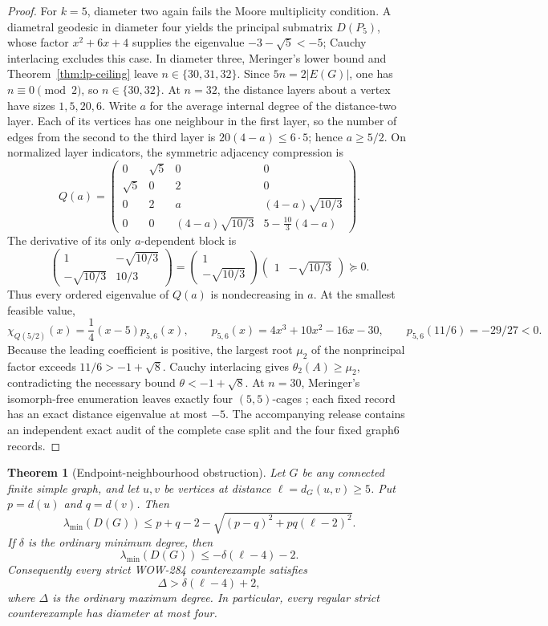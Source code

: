 \documentclass[a4paper,10pt,reqno]{amsart}
\theoremstyle{plain}
\newtheorem{theorem}{Theorem}[section]
\theoremstyle{definition}
\theoremstyle{remark}
\newcommand{\resultbox}[1]{\boxed{#1}}
\begin{document}
\begin{proof}
For \(k=5\), diameter two again fails the Moore multiplicity condition.
A diametral geodesic in diameter four yields the principal submatrix
\(D(P_5)\), whose factor \(x^2+6x+4\) supplies the eigenvalue
\(-3-\sqrt5<-5\); Cauchy interlacing excludes this case.  In diameter
three, Meringer's lower bound and Theorem~\ref{thm:lp-ceiling} leave
\(n\in\{30,31,32\}\).  Since \(5n=2|E(G)|\), one has
\(n\equiv0\pmod2\), so \(n\in\{30,32\}\).  At \(n=32\), the distance
layers about a vertex have sizes \(1,5,20,6\).  Write \(a\) for the average
internal degree of the distance-two layer.  Each of its vertices has one
neighbour in the first layer, so the number of edges from the second to the
third layer is \(20(4-a)\le6\cdot5\); hence \(a\ge5/2\).  On normalized
layer indicators, the symmetric adjacency compression is
\[
 Q(a)=
 \begin{pmatrix}
 0&\sqrt5&0&0\\
 \sqrt5&0&2&0\\
 0&2&a&(4-a)\sqrt{10/3}\\
 0&0&(4-a)\sqrt{10/3}&5-\frac{10}{3}(4-a)
 \end{pmatrix}.
\]
The derivative of its only \(a\)-dependent block is
\[
 \begin{pmatrix}1&-\sqrt{10/3}\\-\sqrt{10/3}&10/3\end{pmatrix}
 =
 \begin{pmatrix}1\\-\sqrt{10/3}\end{pmatrix}
 \begin{pmatrix}1&-\sqrt{10/3}\end{pmatrix}\succeq0.
\]
Thus every ordered eigenvalue of \(Q(a)\) is nondecreasing in \(a\).
At the smallest feasible value,
\[
 \chi_{Q(5/2)}(x)=\frac14(x-5)p_{5,6}(x),
 \qquad
 p_{5,6}(x)=4x^3+10x^2-16x-30,
 \qquad p_{5,6}(11/6)=-29/27<0.
\]
Because the leading coefficient is positive, the largest root \(\mu_2\) of
the nonprincipal factor exceeds \(11/6>-1+\sqrt8\).  Cauchy interlacing gives
\(\theta_2(A)\ge\mu_2\), contradicting the necessary bound
\(\theta<-1+\sqrt8\).  At \(n=30\), Meringer's isomorph-free enumeration
leaves exactly four \((5,5)\)-cages \cite[p.~142]{Meringer1999}; each fixed record has
an exact distance eigenvalue at most \(-5\).
The accompanying release contains an independent exact audit of the complete
case split and the four fixed graph6 records.
\end{proof}

\begin{theorem}[Endpoint-neighbourhood obstruction]\label{thm:endpoint-diameter}
Let \(G\) be any connected finite simple graph, and let \(u,v\) be vertices at
distance \(\ell=d_G(u,v)\ge5\).  Put \(p=d(u)\) and \(q=d(v)\).  Then
\[
 \resultbox{
 \lambda_{\min}(D(G))
 \le p+q-2-\sqrt{(p-q)^2+pq(\ell-2)^2}.
 }
\]
If \(\delta\) is the ordinary minimum degree, then
\[
 \resultbox{
 \lambda_{\min}(D(G))\le-\delta(\ell-4)-2.
 }
\]
Consequently every strict WOW-284 counterexample satisfies
\[
 \Delta>\delta(\ell-4)+2,
\]
where \(\Delta\) is the ordinary maximum degree.
In particular, every regular strict counterexample has diameter at most four.
\end{theorem}
\end{document}
